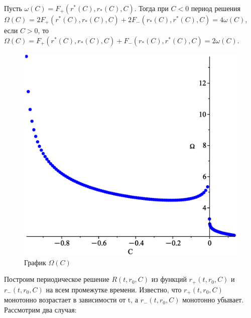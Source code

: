 Пусть $\omega(C) = F_+(r^*(C),r_*(C), C)$. Тогда при $C < 0$ период решения $\Omega(C)$ = $ 2F_+(r^*(C),r_*(C), C) + 2F_-(r_*(C), r^*(C), C) = 4\omega(C)$,\\ если $C > 0$, то $\Omega(C) = F_+(r^*(C),r_*(C), C) + F_-(r_*(C), r^*(C), C) = 2\omega(C)$.
\begin{figure}[ht!]
\begin{center}
\includegraphics[scale=0.45]{omega.eps}
\caption{График $\Omega(C)$}
\end{center}
\end{figure}
\newpage
Построим периодическое решение $R(t,r_0, C)$ из функций $r_+(t, r_0, C)$ и $r_-(t,r_0, C)$ на всем промежутке времени. Известно, что $r_+(t,r_0, C)$ монотонно возрастает в зависимости от t, а $r_-(t,r_0,C)$ монотонно убывает. Рассмотрим два случая:
